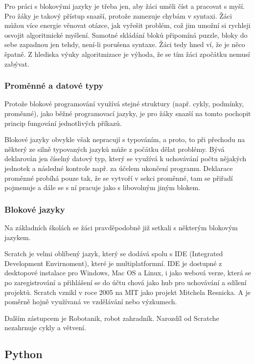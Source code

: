 \documentclass[
  digital,     %
  oneside,     %
  nosansbold,  %
  colorbold, %
  lof,         %
  nolot,         %
]{fithesis4}
\begin{document}
Pro práci s blokovými jazyky je třeba jen, aby žáci uměli číst a pracovat s myší. Pro žáky je takový přístup snazší, protože zamezuje chybám v syntaxi. Žáci můžou více energie věnovat otázce, jak vyřešit problém, což jim umožní si rychleji osvojit algoritmické myšlení. Samotné skládání bloků připomíná puzzle, bloky do sebe zapadnou jen tehdy, není-li porušena syntaxe. Žáci tedy hned ví, že je něco špatně. Z hlediska výuky algoritmizace je výhoda, že se tím žáci zpočátku nemusí zabývat.

\subsubsection{Proměnné a datové typy}
Protože blokové programování využívá stejné struktury (např. cykly, podmínky, proměnné), jako běžné programovací jazyky, je pro žáky snazší na tomto pochopit princip fungování jednotlivých příkazů. 

Blokové jazyky obvykle však nepracují s typováním, a proto, to při přechodu na některý ze silně typovaných jazyků může z počátku dělat problémy. Bývá deklarován jen číselný datový typ, který se využívá k uchovávání počtu nějakých jednotek a následné kontrole např. za účelem ukončení programu. Deklarace proměnné probíhá pouze tak, že se vytvoří v sekci proměnné, tam se přiřadí pojmenuje a dále se s ní pracuje jako s libovolným jiným blokem.

\subsubsection{Blokové jazyky}
Na základních školách se žáci pravděpodobně již setkali s některým blokovým jazykem.

Scratch je velmi oblíbený jazyk, který se dodává spolu s IDE (Integrated Development Envirnoment), které je multiplatformní. IDE je dostupné z desktopové instalace pro Windows, Mac OS a Linux, i jako webová verze, která se po zaregistrování a přihlášení se do účtu chová jako hub pro uchovávání a sdílení projektů. Scratch vznikl v roce 2005 na MIT jako projekt Mitchela Resnicka. A je poměrně hojně využívaná ve vzdělávání nebo výzkumech.

Dalším zástupcem je Robotanik, robot zahradník. Narozdíl od Scratche nezahrnuje cykly a větvení.

\subsection{Python}
\end{document}
